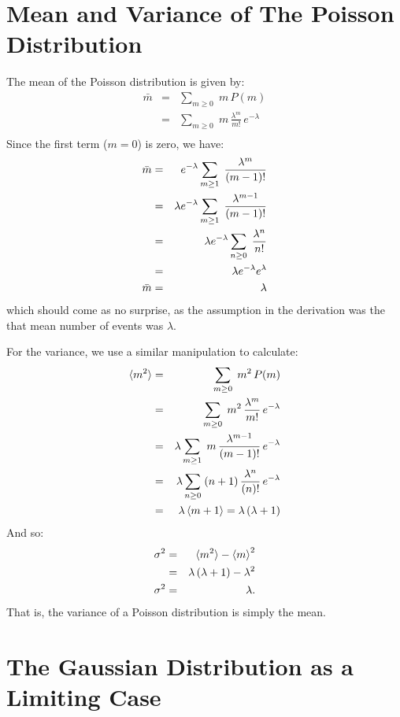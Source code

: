\documentclass[12pt,oneside]{book}
\begin{document}
\section{Mean and Variance of The Poisson Distribution}

The mean of the Poisson distribution is given by:
\begin{eqnarray*}
\bar{m} &=& \sum_{m \geq 0} \; m \, P(m) \\
&=& \sum_{m \geq 0} \; m \, \frac{\lambda^m}{m!} \, e^{-\lambda}\\
\end{eqnarray*}
Since the first term ($m=0$) is zero, we have:
\begin{eqnarray}
\bar{m} &=& e^{-\lambda} \sum_{m \geq 1} \; \frac{\lambda^m}{(m-1)!} \notag \\
             &=& \lambda e^{-\lambda} \sum_{m \geq 1} \; \frac{\lambda^{m-1}}{(m-1)!} \notag \\
             &=& \lambda e^{-\lambda} \sum_{n \geq 0} \; \frac{\lambda^{n}}{n!} \notag \\
             &=& \lambda e^{-\lambda} e^\lambda \notag \\
\bar{m}  &=& \lambda
\end{eqnarray}
which should come as no surprise, as the assumption in the derivation was the that mean number of events was $\lambda$. 

For the variance, we use a similar manipulation to calculate:
\begin{eqnarray*}
\braket{m^2} &=& \sum_{m \geq 0} \; m^2 \, P(m) \\
&=& \sum_{m \geq 0} \; m^2 \, \frac{\lambda^m}{m!} \, e^{-\lambda}\\
&=& \lambda \sum_{m \geq 1} \; m \, \frac{\lambda^{m-1}}{(m-1)!} \, e^{-\lambda}\\
&=& \lambda \sum_{n \geq 0} \; (n+1) \, \frac{\lambda^{n}}{(n)!} \, e^{-\lambda}\\
&=& \lambda \braket{m+1} = \lambda \, (\lambda+1)
\end{eqnarray*}
And so:
\begin{eqnarray}
\sigma^2 &=& \braket{m^2} - \braket{m}^2 \notag \\
&=& \lambda \, (\lambda+1) - \lambda^2 \notag \\
\sigma^2 &=& \lambda. 
\end{eqnarray}
That is, the variance of a Poisson distribution is simply the mean.


\section{The Gaussian Distribution as a Limiting Case}
\end{document}
